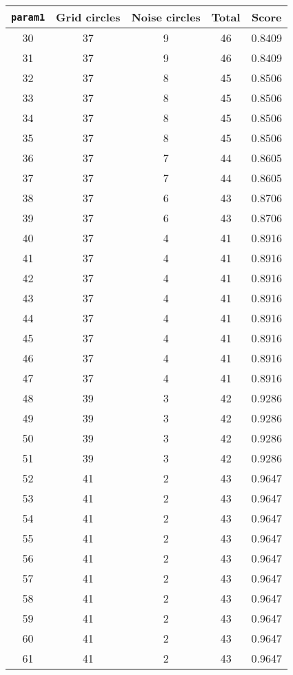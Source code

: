 \documentclass[letterpaper, 12pt]{article}
\begin{document}
\begin{longtable}{|c|c|c|c|c|}
\hline
\textbf{\texttt{param1}} & \textbf{Grid circles} & \textbf{Noise circles} & \textbf{Total} & \textbf{Score} \\
\hline
30 & 37 & 9 & 46 & 0.8409 \\
\hline
31 & 37 & 9 & 46 & 0.8409 \\
\hline
32 & 37 & 8 & 45 & 0.8506 \\
\hline
33 & 37 & 8 & 45 & 0.8506 \\
\hline
34 & 37 & 8 & 45 & 0.8506 \\
\hline
35 & 37 & 8 & 45 & 0.8506 \\
\hline
36 & 37 & 7 & 44 & 0.8605 \\
\hline
37 & 37 & 7 & 44 & 0.8605 \\
\hline
38 & 37 & 6 & 43 & 0.8706 \\
\hline
39 & 37 & 6 & 43 & 0.8706 \\
\hline
40 & 37 & 4 & 41 & 0.8916 \\
\hline
41 & 37 & 4 & 41 & 0.8916 \\
\hline
42 & 37 & 4 & 41 & 0.8916 \\
\hline
43 & 37 & 4 & 41 & 0.8916 \\
\hline
44 & 37 & 4 & 41 & 0.8916 \\
\hline
45 & 37 & 4 & 41 & 0.8916 \\
\hline
46 & 37 & 4 & 41 & 0.8916 \\
\hline
47 & 37 & 4 & 41 & 0.8916 \\
\hline
48 & 39 & 3 & 42 & 0.9286 \\
\hline
49 & 39 & 3 & 42 & 0.9286 \\
\hline
50 & 39 & 3 & 42 & 0.9286 \\
\hline
51 & 39 & 3 & 42 & 0.9286 \\
\hline
52 & 41 & 2 & 43 & 0.9647 \\
\hline
53 & 41 & 2 & 43 & 0.9647 \\
\hline
54 & 41 & 2 & 43 & 0.9647 \\
\hline
55 & 41 & 2 & 43 & 0.9647 \\
\hline
56 & 41 & 2 & 43 & 0.9647 \\
\hline
57 & 41 & 2 & 43 & 0.9647 \\
\hline
58 & 41 & 2 & 43 & 0.9647 \\
\hline
59 & 41 & 2 & 43 & 0.9647 \\
\hline
60 & 41 & 2 & 43 & 0.9647 \\
\hline
61 & 41 & 2 & 43 & 0.9647 \\

\end{longtable}
\end{document}
